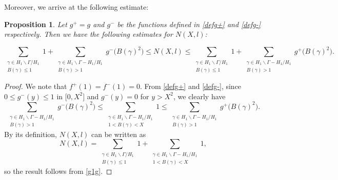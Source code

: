 \documentclass[a4paper,11pt]{amsart}
\newtheorem{proposition}[theorem]{Proposition}
\theoremstyle{definition}
\begin{document}
Moreover, we arrive at the following estimate:
\begin{proposition}
Let $g^{+}=g$ and $g^{-}$  be the functions defined in \eqref{defg+} and \eqref{defg-} respectively. Then we have the following estimates for $N(X,l)$:

    \begin{equation}\label{Nineq}
\sum_{\substack{{\gamma \in H_1 \backslash \Gamma /H_1} \\ B(\gamma) \leq 1 }}1+\sum_{\substack{{\gamma \in H_1 \backslash \Gamma -H_1 /H_1} \\ B(\gamma)>1 }}g^{-}\big(B(\gamma)^2\big) \le N(X,l) \le \sum_{\substack{{\gamma \in H_1 \backslash \Gamma /H_1} \\ B(\gamma)\leq1 }}1+\sum_{\substack{{\gamma \in H_1 \backslash \Gamma -H_1 /H_1} \\ B(\gamma)>1 }}g^{+}\big(B(\gamma)^2\big).
\end{equation}
\end{proposition}
\begin{proof}

We note that $f^{+}(1)=f^{-}(1)=0$.
From \eqref{defg+} and \eqref{defg-}, since $0\le g^{-}(y)\le 1$ in $\big[0,X^2\big]$ and $g^{-}(y)=0$ for $y>X^2$, we clearly have
\begin{equation}\label{g1g}
    \sum_{\substack{{\gamma \in H_1 \backslash \Gamma -H_1 /H_1} \\ B(\gamma)>1 }}g^{-}\big(B(\gamma)^2\big) \le \sum_{\substack{{\gamma \in H_1 \backslash \Gamma -H_1 /H_1} \\1<B(\gamma)<X }}1 \le \sum_{\substack{{\gamma \in H_1 \backslash \Gamma -H_1 /H_1} \\ B(\gamma)>1 }}g^{+}\big(B(\gamma)^2\big).
\end{equation}
By its definition, $N(X,l)$ can be written as 
$$N(X,l)=\sum_{\substack{{\gamma \in H_1 \backslash \Gamma/H_1} \\ B(\gamma)\leq 1 }}1+\sum_{\substack{{\gamma \in H_1 \backslash \Gamma -H_1 /H_1} \\ 1<B(\gamma)<X }}1,$$
so the result follows from \eqref{g1g}. 
\end{proof}
\end{document}
